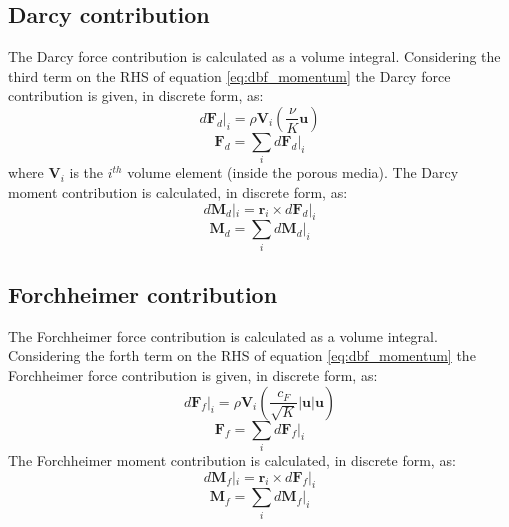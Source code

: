 \documentclass[a4paper,11pt]{report}
\begin{document}
\subsection{Darcy contribution}
The Darcy force contribution is calculated as a volume integral. Considering the third term on the RHS of equation \ref{eq:dbf_momentum} the Darcy force contribution is given, in discrete form, as:
\begin{equation}
    d\mathbf{F}_d|_i = \rho\mathbf{V}_i(\frac{\nu}{K}\mathbf{u})
    \label{eq:dFdi}
\end{equation}
\begin{equation}
    \mathbf{F}_d = \sum_i d\mathbf{F}_d|_i
    \label{eq:Fd}
\end{equation}
where $\mathbf{V}_i$ is the $i^{th}$ volume element (inside the porous media). The Darcy moment contribution is calculated, in discrete form, as:
\begin{equation}
    d\mathbf{M}_d|_i = \mathbf{r}_i\times d\mathbf{F}_d|_i
    \label{eq:dMdi}
\end{equation}
\begin{equation}
    \mathbf{M}_d = \sum_i d\mathbf{M}_d|_i
    \label{eq:Md}
\end{equation}
\subsection{Forchheimer contribution}
The Forchheimer force contribution is calculated as a volume integral. Considering the forth term on the RHS of equation \ref{eq:dbf_momentum} the Forchheimer force contribution is given, in discrete form, as:
\begin{equation}
    d\mathbf{F}_f|_i = \rho\mathbf{V}_i(\frac{c_{F}}{\sqrt{K}}\lvert\mathbf{u}\rvert\mathbf{u})
    \label{eq:dFfi}
\end{equation}
\begin{equation}
    \mathbf{F}_f = \sum_i d\mathbf{F}_f|_i
    \label{eq:Ff}
\end{equation}
The Forchheimer moment contribution is calculated, in discrete form, as:
\begin{equation}
    d\mathbf{M}_f|_i = \mathbf{r}_i\times d\mathbf{F}_f|_i
    \label{eq:dMfi}
\end{equation}
\begin{equation}
    \mathbf{M}_f = \sum_i d\mathbf{M}_f|_i
    \label{eq:Mf}
\end{equation}
\end{document}
